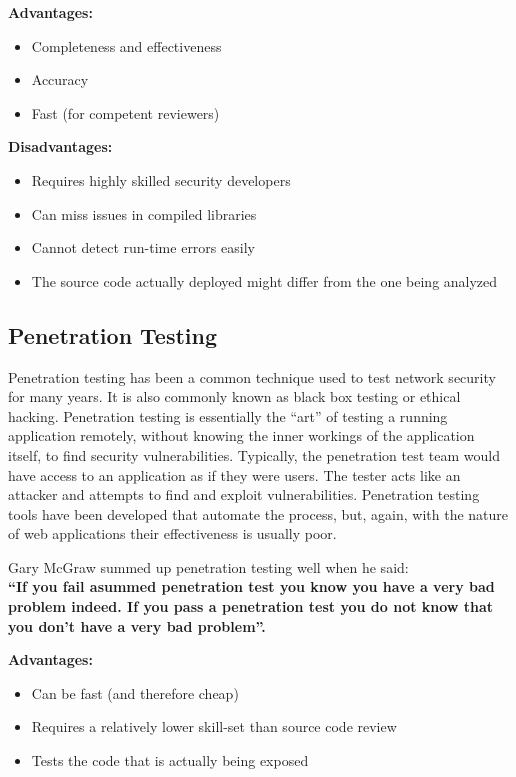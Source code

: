 			{\bf Advantages:}
			\begin{itemize}
				\item Completeness and effectiveness
				\item Accuracy
				\item Fast (for competent reviewers)
			\end{itemize}
			{\bf Disadvantages:}
			\begin{itemize}
				\item Requires highly skilled security developers
				\item Can miss issues in compiled libraries
				\item Cannot detect run-time errors easily
				\item The source code actually deployed might differ from the one being analyzed
			\end{itemize}

		\clearpage	
		\subsection{Penetration Testing}

		Penetration testing has been a common technique used to test network security for 
		many years. It is also commonly known as black box testing or ethical hacking. 
		Penetration testing is essentially the “art” of testing a running application remotely,
		without knowing the inner workings of the application itself, to find security
		vulnerabilities. Typically, the penetration test team would have access to an 
		application as if they were users. The tester acts like an attacker and attempts 
		to find and exploit vulnerabilities. 
		Penetration testing tools have been developed that automate the
		process, but, again, with the nature of web applications their effectiveness is 
		usually poor. 

		Gary McGraw summed up penetration testing well when he said: \\
		{\bf “If you fail asummed penetration test you know you have a very bad problem indeed. 
		If you pass a penetration test you do not know that you don’t have a very bad problem”.}

		{\bf Advantages:}
		\begin{itemize}
			\item Can be fast (and therefore cheap)
			\item Requires a relatively lower skill-set than source code review
			\item Tests the code that is actually being exposed
		\end{itemize}

